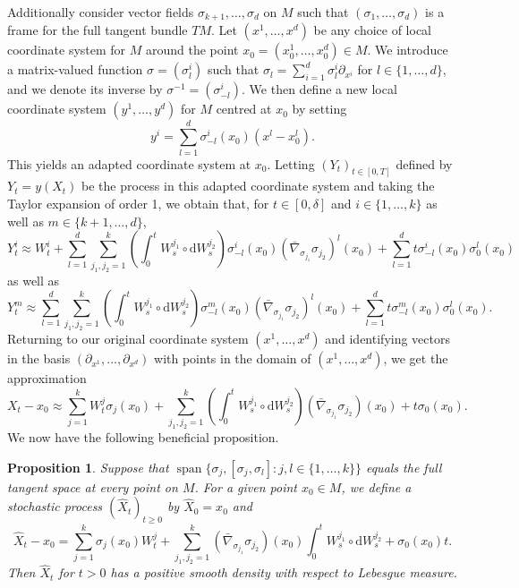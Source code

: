 \documentclass[10pt]{amsart}
\newcounter{dummy} \numberwithin{dummy}{section}
\newtheorem{proposition}[dummy]{Proposition}
\theoremstyle{remark}
\DeclareMathOperator{\spn}{span}
\newcommand{\db}{{\mathrm d}}
\numberwithin{equation}{section}
\begin{document}
Additionally consider vector fields $\sigma_{k+1}, \dots, \sigma_{d}$ on $M$ such that $(\sigma_1, \dots, \sigma_d)$ is a frame for the full tangent bundle $TM$.
Let $(x^1, \dots, x^d)$ be any choice of local coordinate system for $M$ around the point $x_0 = (x^1_0, \dots, x^d_{0})\in M$. We introduce a matrix-valued function $\sigma =(\sigma^i_{l})$ such that $\sigma_l = \sum_{i=1}^d \sigma^i_{l} \partial_{x^i}$ for $l\in\{1,\dots,d\}$, and we denote its inverse by $\sigma^{-1} = (\sigma_{-l}^i)$. We then define a new local coordinate system $(y^1, \dots, y^d)$ for $M$ centred at $x_0$ by setting
\begin{equation} \label{AdaptedStep2} y^i = \sum_{l=1}^d \sigma^{i}_{-l}(x_0) (x^l- x^l_{0}).\end{equation}
This yields an adapted coordinate system at $x_0$.
Letting $(Y_t)_{t\in[0,T]}$ defined by $Y_t = y(X_t)$ be the process in this adapted coordinate system and taking the Taylor expansion of order 1, we obtain that, for $t\in[0,\delta]$ and $i\in\{1,\dots,k\}$ as well as $m\in\{k+1,\dots,d\}$,
$$Y_t^i \approx  W_t^i + \sum_{l=1}^d \sum_{j_1,j_2=1}^k \left(\int_0^t W_s^{j_1} \circ \db W_s^{j_2} \right) \sigma^{i}_{-l}(x_0) (\bar{\nabla}_{\sigma_{j_1}}\sigma_{j_2})^l(x_0) + \sum_{l=1}^d t \sigma^{i}_{-l}(x_0) \sigma^l_0(x_0) $$
as well as
$$Y_t^{m} \approx  \sum_{l=1}^d \sum_{j_1,j_2=1}^k \left(\int_0^t W_s^{j_1} \circ \db W_s^{j_2} \right) \sigma^{m}_{-l}(x_0) (\bar{\nabla}_{\sigma_{j_1}} \sigma_{j_2})^l(x_0) + \sum_{l=1}^d t \sigma^{m}_{-l}(x_0) \sigma^l_0(x_0).$$
Returning to our original coordinate system $(x^1,\dots,x^d)$ and identifying vectors in the basis $(\partial_{x^1}, \dots, \partial_{x^d})$ with points in the domain of $(x^1,\dots,x^d)$, we get the approximation
$$X_t - x_{0} \approx \sum_{j=1}^k W_t^j \sigma_{j}(x_0)  + \sum_{j_1,j_2=1}^k \left(\int_0^t W_s^{j_1} \circ \db W_s^{j_2} \right) (\bar{\nabla}_{\sigma_{j_1}}\sigma_{j_2})(x_0) + t \sigma_0(x_0).$$
We now have the following beneficial proposition.
\begin{proposition}\label{propn:approxpropn}
Suppose that $\spn\{ \sigma_j, [\sigma_{j}, \sigma_{l}] : j,l\in\{1,\dots, k\}\}$ equals the full tangent space at every point on $M$. For a given point $x_0\in M$,  we define a stochastic process $(\hat X_t)_{t\geq 0}$ by $\hat X_0 = x_0$ and
\begin{equation}\label{eq:approxpropn}
    \hat X_t - x_{0} = \sum_{j=1}^k \sigma_{j}(x_0) W_t^j + \sum_{j_1,j_2=1}^k  (\bar{\nabla}_{\sigma_{j_1}}\sigma_{j_2})(x_0) \int_0^t W_s^{j_1} \circ \db W_s^{j_2}+ \sigma_0(x_0)t.
\end{equation}
Then $\hat X_t$  for $t>0$ has a positive smooth density with respect to Lebesgue measure.
\end{proposition}
\end{document}
